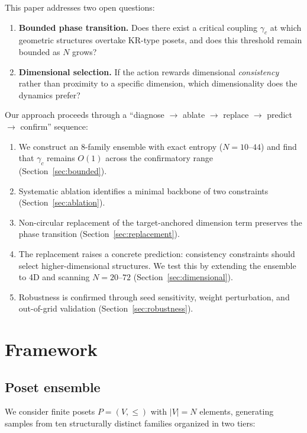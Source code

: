 \documentclass[12pt,a4paper]{article}
\begin{document}
This paper addresses two open questions:

\begin{enumerate}[nosep]
\item \textbf{Bounded phase transition.} Does there exist a critical coupling
$\gamma_c$ at which geometric structures overtake KR-type posets, and does this
threshold remain bounded as $N$ grows?
\item \textbf{Dimensional selection.} If the action rewards dimensional
\emph{consistency} rather than proximity to a specific dimension, which
dimensionality does the dynamics prefer?
\end{enumerate}

Our approach proceeds through a ``diagnose $\to$ ablate $\to$ replace $\to$
predict $\to$ confirm'' sequence:

\begin{enumerate}[nosep]
\item We construct an 8-family ensemble with exact entropy ($N = 10$--$44$) and
find that $\gamma_c$ remains $O(1)$ across the confirmatory range
(Section~\ref{sec:bounded}).
\item Systematic ablation identifies a minimal backbone of two constraints
(Section~\ref{sec:ablation}).
\item Non-circular replacement of the target-anchored dimension term preserves
the phase transition (Section~\ref{sec:replacement}).
\item The replacement raises a concrete prediction: consistency constraints
should select higher-dimensional structures. We test this by extending the
ensemble to 4D and scanning $N = 20$--$72$
(Section~\ref{sec:dimensional}).
\item Robustness is confirmed through seed sensitivity, weight perturbation, and
out-of-grid validation (Section~\ref{sec:robustness}).
\end{enumerate}

\section{Framework}
\label{sec:framework}

\subsection{Poset ensemble}
\label{sec:ensemble}

We consider finite posets $P = (V, \leq)$ with $|V| = N$ elements, generating
samples from ten structurally distinct families organized in two tiers:
\end{document}
